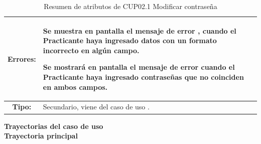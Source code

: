 \begin{table}[H]
\centering
\begin{tabular}{| c | p{12 cm} |}
\hline
\textbf{Errores:} & \vspace{-2mm}	%
					\begin{compactitem}
						\setlength\itemsep{-0.25em}
						\item Se muestra en pantalla el mensaje de error \nameref{msj:MSG13}, cuando el Practicante haya ingresado datos con un formato incorrecto en algún campo.
						\item Se mostrará en pantalla el mensaje de error \nameref{msj:MSG14} cuando el Practicante haya ingresado contraseñas que no coinciden en ambos campos.
					\end{compactitem}\\
\hline
\textbf{Tipo:} & Secundario, viene del caso de uso \nameref{cu:CUP02}.\\
\hline	
\end{tabular}
\caption{Resumen de atributos de CUP02.1 Modificar contraseña}
\label{tab:CUP02.1}
\end{table} 

\textbf{\textcolor[rgb]{0, 0, 0.545098}{Trayectorias del caso de uso}} \\

\textbf{\large{Trayectoria principal}} \\

